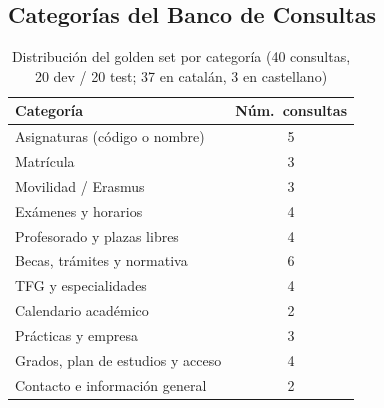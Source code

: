 \documentclass[12pt, a4paper, twoside]{report}
\begin{document}
\begin{appendices}
\chapter{Categor\'ias del Banco de Consultas}
\label{app:goldenset}

\begin{table}[H]
\centering
\caption{Distribuci\'on del golden set por categor\'ia (40 consultas, 20 dev / 20 test; 37 en catal\'an, 3 en castellano)}
\label{tab:goldenset-categorias}
\begin{tabular}{lc}
\toprule
\textbf{Categor\'ia} & \textbf{N\'um.\ consultas} \\
\midrule
Asignaturas (c\'odigo o nombre) & 5 \\
Matr\'icula & 3 \\
Movilidad / Erasmus & 3 \\
Ex\'amenes y horarios & 4 \\
Profesorado y plazas libres & 4 \\
Becas, tr\'amites y normativa & 6 \\
TFG y especialidades & 4 \\
Calendario acad\'emico & 2 \\
Pr\'acticas y empresa & 3 \\
Grados, plan de estudios y acceso & 4 \\
Contacto e informaci\'on general & 2 \\
\bottomrule
\end{tabular}
\end{table}

\end{appendices}
\end{document}
